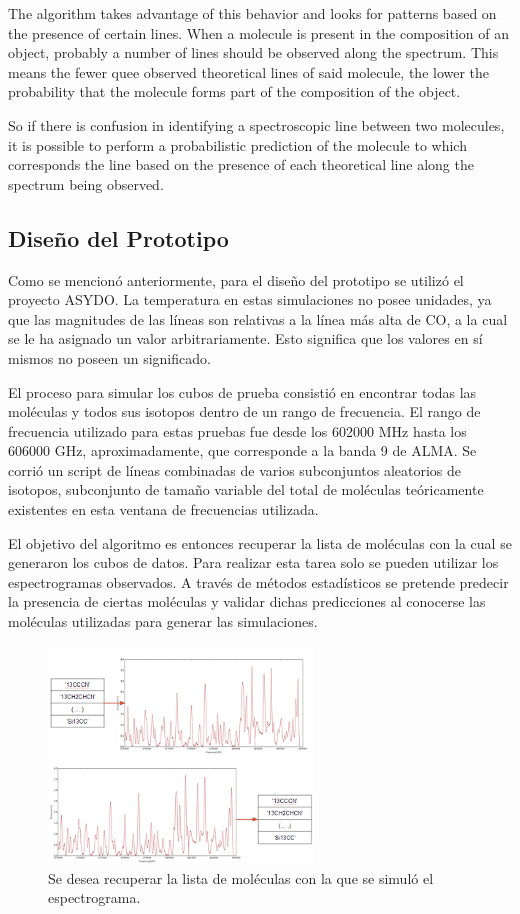 \documentclass[twocolumn, draft]{emulateapj}
\begin{document}
The algorithm takes advantage of this behavior and looks for patterns based on the presence of certain lines. When a molecule is present in the composition of an object, probably a number of lines should be observed along the spectrum. This means the fewer quee observed theoretical lines of said molecule, the lower the probability that the molecule forms part of the composition of the object.

So if there is confusion in identifying a spectroscopic line between two molecules, it is possible to perform a probabilistic prediction of the molecule to which corresponds the line based on the presence of each theoretical line along the spectrum being observed.


\subsection{Diseño del Prototipo}

Como se mencionó anteriormente, para el diseño del prototipo se utilizó el proyecto ASYDO. La temperatura en estas simulaciones no posee unidades, ya que las magnitudes de las líneas son relativas a la línea más alta de CO, a la cual se le ha asignado un valor arbitrariamente. Esto significa que los valores en sí mismos no poseen un significado.

El proceso para simular los cubos de prueba consistió en encontrar todas las moléculas y todos sus isotopos dentro de un rango de frecuencia. El rango de frecuencia utilizado para estas pruebas fue desde los 602000 MHz hasta los 606000 GHz, aproximadamente, que corresponde a la banda 9 de ALMA. Se corrió un script de líneas combinadas de varios subconjuntos aleatorios de isotopos, subconjunto de tamaño variable del total de moléculas teóricamente existentes en esta ventana de frecuencias utilizada.

El objetivo del algoritmo es entonces recuperar la lista de moléculas con la cual se generaron los cubos de datos. Para realizar esta tarea solo se pueden utilizar los espectrogramas observados. A través de métodos estadísticos se pretende predecir la presencia de ciertas moléculas y validar dichas predicciones al conocerse las moléculas utilizadas para generar las simulaciones.


\begin{figure}[H]
	\begin{center}
		\includegraphics[width=70mm]{images/fig0}
		\caption{Se desea recuperar la lista de moléculas con la que se simuló el espectrograma. }
	\end{center}
\end{figure}
\end{document}
